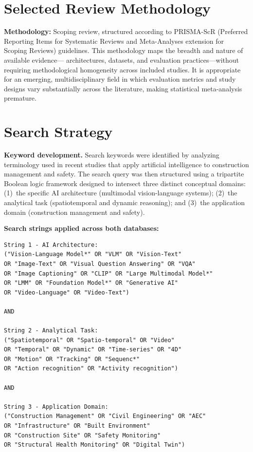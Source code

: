 \documentclass[12pt, letterpaper]{article}
\begin{document}
\section{Selected Review Methodology}

\noindent\textbf{Methodology:} Scoping review, structured according to
PRISMA-ScR (Preferred Reporting Items for Systematic Reviews and Meta-Analyses
extension for Scoping Reviews) guidelines.
This methodology maps the breadth and nature of available evidence---
architectures, datasets, and evaluation practices---without requiring
methodological homogeneity across included studies. It is appropriate for an
emerging, multidisciplinary field in which evaluation metrics and study
designs vary substantially across the literature, making statistical
meta-analysis premature.

\section{Search Strategy}

\noindent\textbf{Keyword development.} Search keywords were identified by
analyzing terminology used in recent studies that apply artificial intelligence
to construction management and safety. The search query was then structured
using a tripartite Boolean logic framework designed to intersect three distinct
conceptual domains: (1)~the specific AI architecture (multimodal vision-language
systems); (2)~the analytical task (spatiotemporal and dynamic reasoning); and
(3)~the application domain (construction management and safety).

\noindent\textbf{Search strings applied across both databases:}

\begin{singlespace}
\begin{lstlisting}[caption={},nolol]
String 1 - AI Architecture:
("Vision-Language Model*" OR "VLM" OR "Vision-Text"
OR "Image-Text" OR "Visual Question Answering" OR "VQA"
OR "Image Captioning" OR "CLIP" OR "Large Multimodal Model*"
OR "LMM" OR "Foundation Model*" OR "Generative AI"
OR "Video-Language" OR "Video-Text")

AND

String 2 - Analytical Task:
("Spatiotemporal" OR "Spatio-temporal" OR "Video"
OR "Temporal" OR "Dynamic" OR "Time-series" OR "4D"
OR "Motion" OR "Tracking" OR "Sequenc*"
OR "Action recognition" OR "Activity recognition")

AND

String 3 - Application Domain:
("Construction Management" OR "Civil Engineering" OR "AEC"
OR "Infrastructure" OR "Built Environment"
OR "Construction Site" OR "Safety Monitoring"
OR "Structural Health Monitoring" OR "Digital Twin")
\end{lstlisting}
\end{singlespace}
\end{document}
